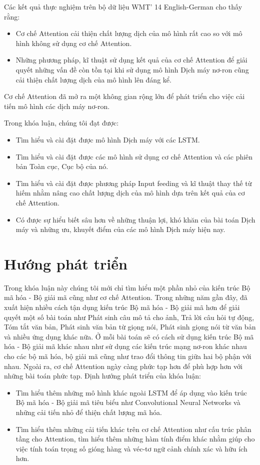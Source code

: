 Các kết quả thực nghiệm trên bộ dữ liệu WMT' 14 English-German cho thấy rằng:
\begin{itemize}
	\item Cơ chế Attention cải thiện chất lượng dịch của mô hình rất cao so với mô hình không sử dụng cơ chế Attention.
	\item Những phương pháp, kĩ thuật sử dụng kết quả của cơ chế Attention để giải quyết những vấn đề còn tồn tại khi sử dụng mô hình Dịch máy nơ-ron cũng cải thiện chất lượng dịch của mô hình lên đáng kể.
\end{itemize}

Cơ chế Attention đã mở ra một không gian rộng lớn để phát triển cho việc cải tiến mô hình các dịch máy nơ-ron.

Trong khóa luận, chúng tôi đạt được:
\begin{itemize}
	\item Tìm hiểu và cài đặt được mô hình Dịch máy với các LSTM.
	\item Tìm hiểu và cài đặt được các mô hình sử dụng cơ chế Attention và các phiên bản Toàn cục, Cục bộ của nó.
	\item Tìm hiểu và cài đặt được phương pháp Input feeding và kĩ thuật thay thế từ hiếm nhằm nâng cao chất lượng dịch của mô hình dựa trên kết quả của cơ chế Attention.
	\item Có được sự hiểu biết sâu hơn về những thuận lợi, khó khăn của bài toán Dịch máy và những ưu, khuyết điểm của các mô hình Dịch máy hiện nay.
\end{itemize}

\section{Hướng phát triển}
Trong khóa luận này chúng tôi mới chỉ tìm hiểu một phần nhỏ của kiến trúc Bộ mã hóa - Bộ giải mã cũng như cơ chế Attention. Trong những năm gần đây, đã xuất hiện nhiều cách tận dụng kiến trúc Bộ mã hóa - Bộ giải mã hơn để giải quyết một số bài toán như Phát sinh câu mô tả cho ảnh, Trả lời câu hỏi tự động, Tóm tắt văn bản, Phát sinh văn bản từ giọng nói, Phát sinh giọng nói từ văn bản và nhiều ứng dụng khác nữa. Ở mỗi bài toán sẽ có cách sử dụng kiến trúc Bộ mã hóa - Bộ giải mã khác nhau như sử dụng các kiến trúc mạng nơ-ron khác nhau cho các bộ mã hóa, bộ giải mã cũng như trao đổi thông tin giữa hai bộ phận với nhau. Ngoài ra, cơ chế Attention ngày càng phức tạp hơn để phù hợp hơn với những bài toán phức tạp. Định hướng phát triển của khóa luận:
\begin{itemize}
	\item Tìm hiểu thêm những mô hình khác ngoài LSTM để áp dụng vào kiến trúc Bộ mã hóa - Bộ giải mã tiêu biểu như Convolutional Neural Networks và những cải tiến nhỏ để thiện chất lượng mã hóa.
	\item Tìm hiểu thêm những cải tiến khác trên cơ chế Attention như cấu trúc phân tầng cho Attention, tìm hiểu thêm những hàm tính điểm khác nhằm giúp cho việc tính toán trọng số gióng hàng và véc-tơ ngữ cảnh chính xác và hữu ích hơn. 
\end{itemize}



